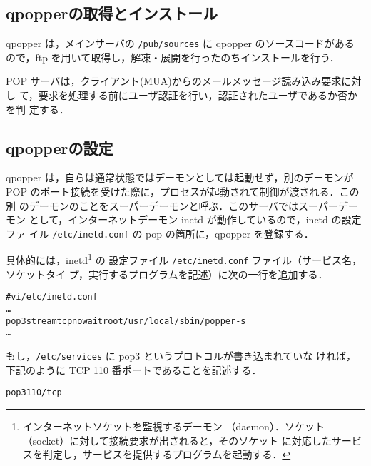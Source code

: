 \subsection{qpopperの取得とインストール}
qpopper は，メインサーバの \texttt{/pub/sources} に qpopper のソースコードがある
ので，ftp を用いて取得し，解凍・展開を行ったのちインストールを行う．

POP サーバは，クライアント(MUA)からのメールメッセージ読み込み要求に対し
て，要求を処理する前にユーザ認証を行い，認証されたユーザであるか否かを判
定する．
% 

\subsection{qpopperの設定}
qpopper は，自らは通常状態ではデーモンとしては起動せず，別のデーモンが
POP のポート接続を受けた際に，プロセスが起動されて制御が渡される．この別
のデーモンのことをスーパーデーモンと呼ぶ．このサーバではスーパーデーモン
として，インターネットデーモン inetd が動作しているので，inetd の設定ファ
イル \texttt{/etc/inetd.conf} の pop の箇所に，qpopper を登録する．

具体的には，inetd\footnote{インターネットソケットを監視するデーモン
（daemon）．ソケット（socket）に対して接続要求が出されると，そのソケット
に対応したサービスを判定し，サービスを提供するプログラムを起動する．} の
設定ファイル \texttt{/etc/inetd.conf} ファイル（サービス名，ソケットタイ
プ，実行するプログラムを記述）に次の一行を追加する．
\begin{center}
\begin{breakbox}
\begin{alltt}
# vi /etc/inetd.conf
   …
pop3    stream  tcp     nowait  root    /usr/local/sbin/popper -s
   …
\end{alltt}
\end{breakbox}
\end{center}

もし，\texttt{/etc/services} に pop3 というプロトコルが書き込まれていな
ければ，下記のように TCP 110 番ポートであることを記述する．

\begin{center}
\begin{breakbox}
\begin{alltt}
pop3    110/tcp
\end{alltt}
\end{breakbox}
\end{center}

